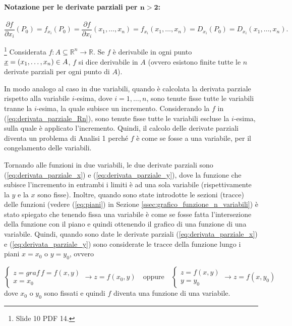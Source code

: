 \paragraph{Notazione per le derivate parziali per $\boldsymbol{n>2}$:}
\begin{equation*}
    \frac{\partial f}{\partial x_i}(P_0)=f_{x_i}(P_0)=\frac{\partial f}{\partial x_i}(x_1,\hdots,x_n)=f_{x_i}(x_1,\hdots,x_n)=  D_{x_i}(P_0)=D_{x_i}(x_1,\hdots,x_n).
\end{equation*}

\begin{definition}[Derivabilità in $A$]\footnote{Slide 10 PDF 14.}
   Considerata $f:A\subseteq\mathbb R^n\rightarrow\mathbb R$. Se $f$ è derivabile in ogni punto $\uline x=(x_1,\hdots,x_n)\in A$, $f$ si dice derivabile in $A$ (ovvero esistono finite tutte le $n$ derivate parziali per ogni punto di $A$).
\end{definition}

In modo analogo al caso in due variabili, quando è calcolata la derivata parziale rispetto alla variabile $i$-esima, dove $i=1,\hdots,n$, sono tenute fisse tutte le variabili tranne la $i$-esima, la quale subisce un incremento. Considerando la $f$ in (\ref{eq:derivata_parziale_Rn}), sono tenute fisse tutte le variabili escluse la $i$-esima, sulla quale è applicato l'incremento. Quindi, il calcolo delle derivate parziali diventa un problema di Analisi 1 perché $f$ è come se fosse a una variabile, per il congelamento delle variabili.

Tornando alle funzioni in due variabili, le due derivate parziali sono (\ref{eq:derivata_parziale_x}) e (\ref{eq:derivata_parziale_y}), dove la funzione che subisce l'incremento in entrambi i limiti è ad una sola variabile (rispettivamente la $y$ e la $x$ sono fisse). Inoltre, quando sono state introdotte le sezioni (tracce) delle funzioni (vedere (\ref{eq:piani}) in Sezione \ref{ssec:grafico_funzione_n_variabili}) è stato spiegato che tenendo fissa una variabile è come se fosse fatta l'intersezione della funzione con il piano e quindi ottenendo il grafico di una funzione di una variabile. Quindi, quando sono date le derivate parziali (\ref{eq:derivata_parziale_x}) e (\ref{eq:derivata_parziale_y}) sono considerate le tracce della funzione lungo i piani $x=x_0$ o $y=y_0$, ovvero

\begin{equation}\label{eq:sezione_derivate_parziali}
    \begin{cases}
        z=graf\, f=f(x,y)\\
        x=x_0
    \end{cases}\rightarrow z=f(x_0,y)
    \quad\text{oppure}\quad
    \begin{cases}
        z=f(x,y)\\
        y=y_0
    \end{cases}\rightarrow z=f(x,y_0)
\end{equation}
dove $x_0$ o $y_0$ sono fissati e quindi $f$ diventa una funzione di una variabile.

